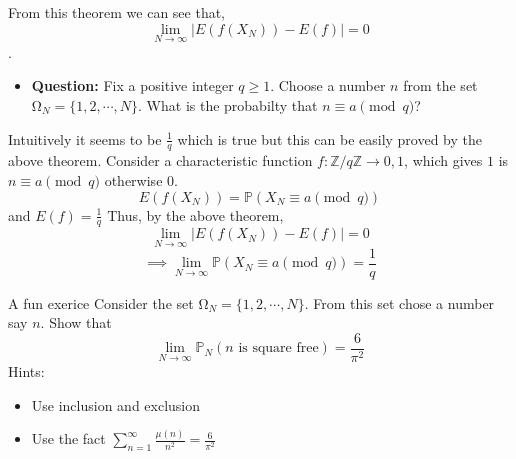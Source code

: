 \documentclass{beamer}
\numberwithin{theorem}{section}
\theoremstyle{definition}
\begin{document}
       \begin{frame}{}
       From this theorem we can see that,
       $$\lim_{N\rightarrow\infty}|E(f(X_N))-E(f)|=0$$.
       \begin{itemize}
           \item \textbf{Question:} Fix a positive integer $q\ge 1$. Choose a number $n$ from the set $\si{\ohm}_N=\{1,2,\cdots,N\}$. What is the probabilty that $n\equiv a \pmod{q}$?\\
           \end{itemize}
           Intuitively it seems to be $\frac{1}{q}$ which is true but this can be easily proved by the above theorem. Consider a characteristic function 
           $f:\mathbb{Z}/q\mathbb{Z}\rightarrow {0,1}$, which gives $1$ is $n\equiv a \pmod{q}$ otherwise $0$.
           $$E(f(X_N))=\mathbb{P}(X_N\equiv a \pmod{q})$$ and $E(f)=\frac{1}{q}$
           Thus, by the above theorem,
           $$\lim_{N\rightarrow\infty}|E(f(X_N))-E(f)|=0$$
           $$\implies \lim_{N\rightarrow\infty}\mathbb{P}(X_N\equiv a\pmod{q})=\frac{1}{q}$$
       \end{frame}
       \begin{frame}{}
       \begin{block}{A fun exerice}
       Consider the set $\si{\ohm}_N=\{1,2,\cdots,N\}$. From this set chose a number say $n$. Show that $$\lim_{N\rightarrow\infty}\mathbb{P}_N(n \text{ is square free})=\frac{6}{\pi^2}$$
       Hints:
       \begin{itemize}
           \item Use inclusion and exclusion
           \item Use the fact $\sum_{n=1}^{\infty}\frac{\mu(n)}{n^2}=\frac{6}{\pi^2}$
       \end{itemize}
           
       \end{block}
           
       \end{frame}
\end{document}
